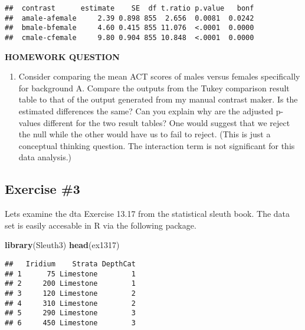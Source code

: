\documentclass[]{article}
\newenvironment{Shaded}{\begin{snugshade}}{\end{snugshade}}
\newcommand{\KeywordTok}[1]{\textcolor[rgb]{0.13,0.29,0.53}{\textbf{#1}}}
\newcommand{\NormalTok}[1]{#1}
\providecommand{\tightlist}{%
  \setlength{\itemsep}{0pt}\setlength{\parskip}{0pt}}
\begin{document}
\begin{verbatim}
##  contrast      estimate    SE  df t.ratio p.value   bonf
##  amale-afemale     2.39 0.898 855  2.656  0.0081  0.0242
##  bmale-bfemale     4.60 0.415 855 11.076  <.0001  0.0000
##  cmale-cfemale     9.80 0.904 855 10.848  <.0001  0.0000
\end{verbatim}

\textbf{HOMEWORK QUESTION}

\begin{enumerate}
\def\labelenumi{\arabic{enumi}.}
\tightlist
\item
  Consider comparing the mean ACT scores of males versus females
  specifically for background A. Compare the outputs from the Tukey
  comparison result table to that of the output generated from my manual
  contrast maker. Is the estimated differences the same? Can you explain
  why are the adjusted p-values different for the two result tables? One
  would suggest that we reject the null while the other would have us to
  fail to reject. (This is just a conceptual thinking question. The
  interaction term is not significant for this data analysis.)
\end{enumerate}

\hypertarget{exercise-3}{%
\subsection{Exercise \#3}\label{exercise-3}}

Lets examine the dta Exercise 13.17 from the statistical sleuth book.
The data set is easily accesable in R via the following package.

\begin{Shaded}
\begin{Highlighting}[]
\KeywordTok{library}\NormalTok{(Sleuth3)}
\KeywordTok{head}\NormalTok{(ex1317)}
\end{Highlighting}
\end{Shaded}

\begin{verbatim}
##   Iridium    Strata DepthCat
## 1      75 Limestone        1
## 2     200 Limestone        1
## 3     120 Limestone        2
## 4     310 Limestone        2
## 5     290 Limestone        3
## 6     450 Limestone        3
\end{verbatim}
\end{document}
